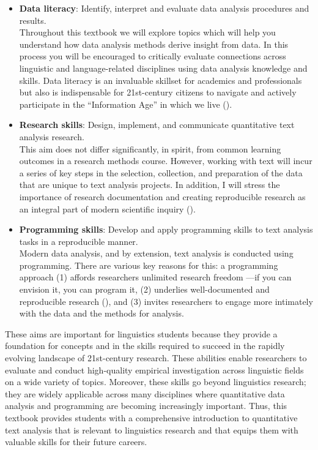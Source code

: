 \documentclass[
  letterpaper,
  krantz1]{latex/krantz-mod}
\theoremstyle{definition}
\theoremstyle{definition}
\theoremstyle{remark}
\begin{document}
\begin{itemize}
\item
  \textbf{Data literacy}: Identify, interpret and
  evaluate data analysis procedures and results.\\
  Throughout this textbook we will explore topics which will help you
  understand how data analysis methods derive insight from data. In this
  process you will be encouraged to critically evaluate connections
  across linguistic and language-related disciplines using data analysis
  knowledge and skills. Data literacy is an invaluable skillset for
  academics and professionals but also is indispensable for 21st-century
  citizens to navigate and actively participate in the ``Information
  Age'' in which we live ().
\item
  \textbf{Research skills}: Design, implement,
  and communicate quantitative text analysis research.\\
  This aim does not differ significantly, in spirit, from common
  learning outcomes in a research methods course. However, working with
  text will incur a series of key steps in the selection, collection,
  and preparation of the data that are unique to text analysis projects.
  In addition, I will stress the importance of research documentation
  and creating reproducible research as an integral part of modern
  scientific inquiry ().
\item
  \textbf{Programming skills}: Develop and
  apply programming skills to text analysis tasks in a reproducible
  manner.\\
  Modern data analysis, and by extension, text analysis is conducted
  using programming. There are various key reasons for this: a
  programming approach (1) affords researchers unlimited research
  freedom ---if you can envision it, you can program it, (2) underlies
  well-documented and reproducible research
  (), and (3)
  invites researchers to engage more intimately with the data and the
  methods for analysis.
\end{itemize}

These aims are important for linguistics students because they provide a
foundation for concepts and in the skills required to succeed in the
rapidly evolving landscape of 21st-century research. These abilities
enable researchers to evaluate and conduct high-quality empirical
investigation across linguistic fields on a wide variety of topics.
Moreover, these skills go beyond linguistics research; they are widely
applicable across many disciplines where quantitative data analysis and
programming are becoming increasingly important. Thus, this textbook
provides students with a comprehensive introduction to quantitative text
analysis that is relevant to linguistics research and that equips them
with valuable skills for their future careers.
\end{document}
